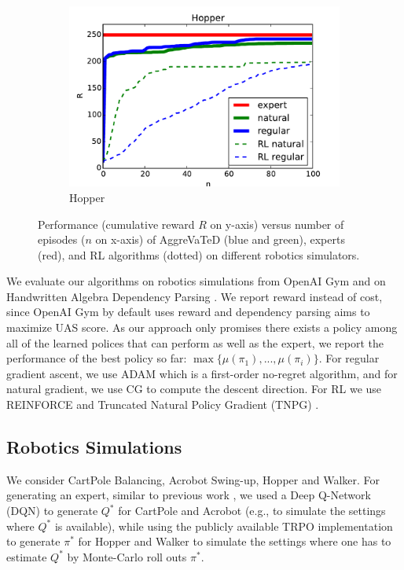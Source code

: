 \documentclass{article}
\begin{document}
\begin{figure}[t!]
\begin{subfigure}[l]{0.1962\textwidth}
        \includegraphics[width=1.12\textwidth,keepaspectratio]{./figure/Hopper_comparison.pdf}
        \caption{Hopper}
        \label{fig:hopper}
    \end{subfigure}
    \caption{Performance (cumulative reward $R$ on y-axis) versus number of episodes ($n$ on x-axis) of AggreVaTeD (blue and green), experts (red), and RL algorithms (dotted) on different robotics simulators. }
    \label{fig:perf_robotics}
\end{figure}
We evaluate our algorithms on robotics simulations from OpenAI Gym \cite{brockman2016openai} and on Handwritten Algebra Dependency Parsing \cite{duyckpredicting}. We report reward instead of cost, since OpenAI Gym by default uses reward and dependency parsing aims to maximize UAS score.  As our approach only promises there exists a policy among all of the learned polices that can perform as well as the expert, we report the performance of the best policy so far: $ \max\{\mu(\pi_1), ..., \mu(\pi_i)\}$. For regular gradient ascent, we use ADAM \cite{kingma2014adam} which is a first-order no-regret algorithm, and for natural gradient, we use CG to compute the descent direction. For RL we use REINFORCE \cite{williams1992simple} and Truncated Natural Policy Gradient (TNPG) \cite{duan2016benchmarking}.


\subsection{Robotics Simulations}
We consider CartPole Balancing, Acrobot Swing-up, Hopper and Walker. For generating an expert, similar to previous work \cite{ho2016generative}, we used a Deep Q-Network (DQN) to generate $Q^*$ for CartPole and Acrobot (e.g., to simulate the settings where $Q^*$ is available), while using the publicly available TRPO implementation to generate $\pi^*$ for Hopper and Walker to simulate the settings where one has to estimate $Q^*$ by Monte-Carlo roll outs $\pi^*$. %
\end{document}
